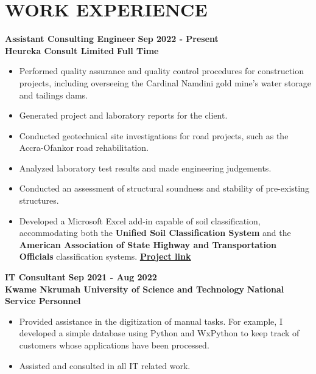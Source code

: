 \documentclass[letterpaper, 12pt]{article}
\newcommand{\cvsection}[1]{
	
	\section*{#1}
}
\newcommand{\verticalSpace}{4pt}
\begin{document}
	
	\cvsection{WORK EXPERIENCE}
	
	\textbf{Assistant Consulting Engineer} \hfill \textbf{Sep 2022 - Present} \\ [\verticalSpace]
	\textbf{Heureka Consult Limited} \hfill \textbf{Full Time}
	
	\begin{itemize}[leftmargin=*]
		
		\item Performed quality assurance and quality control procedures for construction projects, including overseeing the Cardinal Namdini gold mine's water storage and tailings dams.
		\item Generated project and laboratory reports for the client.
		\item Conducted geotechnical site investigations for road projects, such as the Accra-Ofankor road rehabilitation.		
		\item Analyzed laboratory test results and made engineering judgements.
		\item Conducted an assessment of structural soundness and stability of pre-existing structures.
		\item Developed a Microsoft Excel add-in capable of soil classification, accommodating both the \textbf{Unified Soil Classification System} and the \textbf{American Association of State Highway and Transportation Officials} classification systems.	\href{https://github.com/patrickboateng/geolab/tree/main/geolab-excel-addin}{\underline{\textbf{Project link}}} \\
		
	\end{itemize}
	
	\textbf{IT Consultant} \hfill \textbf{Sep 2021 - Aug 2022} \\ [\verticalSpace]
	\textbf{Kwame Nkrumah University of Science and Technology} \hfill \textbf{National Service Personnel}
	
	\begin{itemize}[leftmargin=*]
		
		\item Provided assistance in the digitization of manual tasks. For example, I developed a simple database using Python and WxPython to keep track of customers whose applications have been processed.
		\item Assisted and consulted in all IT related work. \\
		
	\end{itemize} 
	
\end{document}
